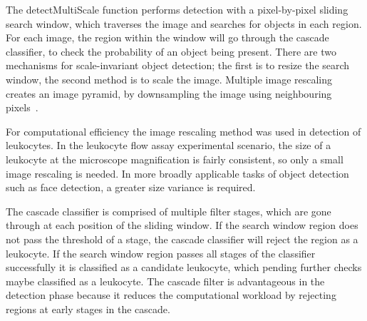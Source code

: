 The detectMultiScale function performs detection with a pixel-by-pixel sliding search window, which traverses the image and searches for objects in each region. For each image, the region within the window will go through the cascade classifier, to check the probability of an object being present. There are two mechanisms for scale-invariant object detection; the first is to resize the search window, the second method is to scale the image. Multiple image rescaling creates an image pyramid, by downsampling the image using neighbouring pixels~\cite{Qiao2010}.

For computational efficiency the image rescaling method was used in detection of leukocytes. In the leukocyte flow assay experimental scenario, the size of a leukocyte at the microscope magnification is fairly consistent, so only a small image rescaling is needed. In more broadly applicable tasks of object detection such as face detection, a greater size variance is required.

The cascade classifier is comprised of multiple filter stages, which are gone through at each position of the sliding window. If the search window region does not pass the threshold of a stage, the cascade classifier will reject the region as a leukocyte. If the search window region passes all stages of the classifier successfully it is classified as a candidate leukocyte, which pending further checks maybe classified as a leukocyte. The cascade filter is advantageous in the detection phase because it reduces the computational workload by rejecting regions at early stages in the cascade.

